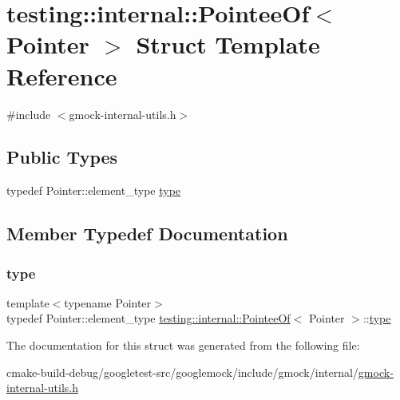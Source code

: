 \hypertarget{structtesting_1_1internal_1_1PointeeOf}{}\section{testing\+::internal\+::Pointee\+Of$<$ Pointer $>$ Struct Template Reference}
\label{structtesting_1_1internal_1_1PointeeOf}


{\ttfamily \#include $<$gmock-\/internal-\/utils.\+h$>$}

\subsection*{Public Types}
\begin{DoxyCompactItemize}
\item 
typedef Pointer\+::element\+\_\+type \mbox{\hyperlink{structtesting_1_1internal_1_1PointeeOf_aca4d92c8f978e47a8695e82cffc11837}{type}}
\end{DoxyCompactItemize}


\subsection{Member Typedef Documentation}
\mbox{\label{structtesting_1_1internal_1_1PointeeOf_aca4d92c8f978e47a8695e82cffc11837}} 
\subsubsection{\texorpdfstring{type}{type}}
{\footnotesize\ttfamily template$<$typename Pointer$>$ \\
typedef Pointer\+::element\+\_\+type \mbox{\hyperlink{structtesting_1_1internal_1_1PointeeOf}{testing\+::internal\+::\+Pointee\+Of}}$<$ Pointer $>$\+::\mbox{\hyperlink{structtesting_1_1internal_1_1PointeeOf_aca4d92c8f978e47a8695e82cffc11837}{type}}}



The documentation for this struct was generated from the following file\+:\begin{DoxyCompactItemize}
\item 
cmake-\/build-\/debug/googletest-\/src/googlemock/include/gmock/internal/\mbox{\hyperlink{gmock-internal-utils_8h}{gmock-\/internal-\/utils.\+h}}\end{DoxyCompactItemize}
